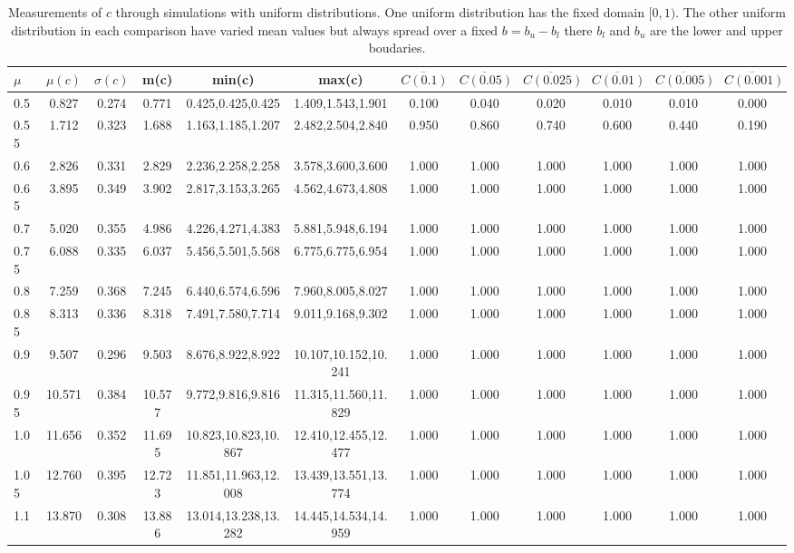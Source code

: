 \begin{table*}[h!]
\begin{center}
\begin{tabular}{| l | c | c | c | c | c | c | c | c | c | c | c |}\hline
$\mu$ & $\mu(c)$ & $\sigma(c)$ & m(c) & min(c) & max(c) & $\overline{C(0.1)}$ & $\overline{C(0.05)}$ & $\overline{C(0.025)}$ & $\overline{C(0.01)}$ & $\overline{C(0.005)}$ & $\overline{C(0.001)}$ \\\hline
0.5 & 0.827 & 0.274 & 0.771 & 0.425,0.425,0.425 & 1.409,1.543,1.901  & 0.100  & 0.040  & 0.020  & 0.010  & 0.010  & 0.000 \\\hline
0.55 & 1.712 & 0.323 & 1.688 & 1.163,1.185,1.207 & 2.482,2.504,2.840  & 0.950  & 0.860  & 0.740  & 0.600  & 0.440  & 0.190 \\\hline
0.6 & 2.826 & 0.331 & 2.829 & 2.236,2.258,2.258 & 3.578,3.600,3.600  & 1.000  & 1.000  & 1.000  & 1.000  & 1.000  & 1.000 \\\hline
0.65 & 3.895 & 0.349 & 3.902 & 2.817,3.153,3.265 & 4.562,4.673,4.808  & 1.000  & 1.000  & 1.000  & 1.000  & 1.000  & 1.000 \\\hline
0.7 & 5.020 & 0.355 & 4.986 & 4.226,4.271,4.383 & 5.881,5.948,6.194  & 1.000  & 1.000  & 1.000  & 1.000  & 1.000  & 1.000 \\\hline
0.75 & 6.088 & 0.335 & 6.037 & 5.456,5.501,5.568 & 6.775,6.775,6.954  & 1.000  & 1.000  & 1.000  & 1.000  & 1.000  & 1.000 \\\hline
0.8 & 7.259 & 0.368 & 7.245 & 6.440,6.574,6.596 & 7.960,8.005,8.027  & 1.000  & 1.000  & 1.000  & 1.000  & 1.000  & 1.000 \\\hline
0.85 & 8.313 & 0.336 & 8.318 & 7.491,7.580,7.714 & 9.011,9.168,9.302  & 1.000  & 1.000  & 1.000  & 1.000  & 1.000  & 1.000 \\\hline
0.9 & 9.507 & 0.296 & 9.503 & 8.676,8.922,8.922 & 10.107,10.152,10.241  & 1.000  & 1.000  & 1.000  & 1.000  & 1.000  & 1.000 \\\hline
0.95 & 10.571 & 0.384 & 10.577 & 9.772,9.816,9.816 & 11.315,11.560,11.829  & 1.000  & 1.000  & 1.000  & 1.000  & 1.000  & 1.000 \\\hline
1.0 & 11.656 & 0.352 & 11.695 & 10.823,10.823,10.867 & 12.410,12.455,12.477  & 1.000  & 1.000  & 1.000  & 1.000  & 1.000  & 1.000 \\\hline
1.05 & 12.760 & 0.395 & 12.723 & 11.851,11.963,12.008 & 13.439,13.551,13.774  & 1.000  & 1.000  & 1.000  & 1.000  & 1.000  & 1.000 \\\hline
1.1 & 13.870 & 0.308 & 13.886 & 13.014,13.238,13.282 & 14.445,14.534,14.959  & 1.000  & 1.000  & 1.000  & 1.000  & 1.000  & 1.000 \\\hline
\end{tabular}
\caption{Measurements of $c$ through simulations
with uniform distributions.
One uniform distribution has the fixed domain $[0,1)$.
The other uniform distribution in each comparison
have varied mean values but always
spread over a fixed $b=b_u-b_l$ there $b_l$ and $b_u$ are the lower and upper boudaries.}
\end{center}
\end{table*}